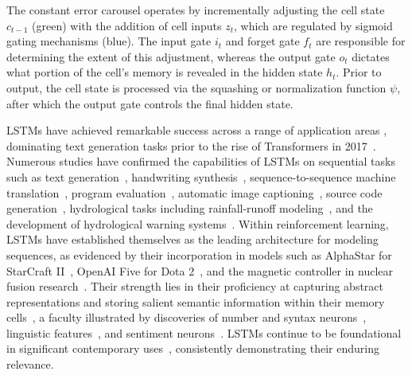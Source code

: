 The constant error carousel operates by incrementally adjusting the cell state $c_{t-1}$ (green) with the addition of cell inputs $z_t$, which are regulated by sigmoid gating mechanisms (blue). The input gate $i_t$ and forget gate $f_t$ are responsible for determining the extent of this adjustment, whereas the output gate $o_t$ dictates what portion of the cell’s memory is revealed in the hidden state $h_t$. Prior to output, the cell state is processed via the squashing or normalization function $\psi$, after which the output gate controls the final hidden state.

LSTMs have achieved remarkable success across a range of application areas \citep{Hochreiter:01,Hochreiter:07,Schmidhuber:15}, dominating text generation tasks prior to the rise of Transformers in 2017~\citep{Vaswani:17}. Numerous studies have confirmed the capabilities of LSTMs on sequential tasks such as text generation~\citep{Graves:13,Karpathy:15blog}, handwriting synthesis~\citep{Graves:13}, sequence-to-sequence machine translation~\citep{Sutskever:14nips}, program evaluation~\citep{Zaremba:14arxiv}, automatic image captioning~\citep{Karpathy:15,Hossain:19}, source code generation~\citep{Karpathy:15blog}, hydrological tasks including rainfall-runoff modeling~\citep{Kratzert:18,Kratzert:19}, and the development of hydrological warning systems~\citep{Nearing:24}. Within reinforcement learning, LSTMs have established themselves as the leading architecture for modeling sequences, as evidenced by their incorporation in models such as AlphaStar for StarCraft II~\citep{Vinyals:17short}, OpenAI Five for Dota 2~\citep{OpenAI:19}, and the magnetic controller in nuclear fusion research~\citep{Degrave:22short}. Their strength lies in their proficiency at capturing abstract representations and storing salient semantic information within their memory cells~\citep{Karpathy:15blog}, a faculty illustrated by discoveries of number and syntax neurons~\citep{Lakretz:19}, linguistic features~\citep{Bau:19}, and sentiment neurons~\citep{Radford:17arxiv}. LSTMs continue to be foundational in significant contemporary uses~\citep{Degrave:22short,Nearing:24}, consistently demonstrating their enduring relevance.

